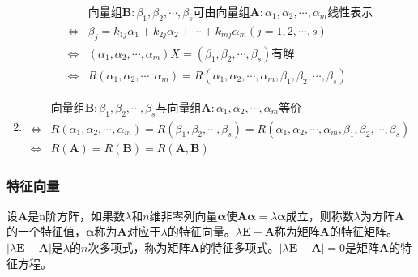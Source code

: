\documentclass[12pt]{book}
\begin{document}
\begin{enumerate}[1.]
\begin{align*}
                              & \text{向量组}\bm{B}:\beta_1,\beta_2,\cdots,\beta_s\text{可由向量组}\bm{A}:\alpha_1,\alpha_2,\cdots,\alpha_m\text{线性表示}                    \\
              \Leftrightarrow & \beta_j = k_{1j}\alpha_1+k_{2j}\alpha_2+\cdots+k_{mj}\alpha_m (j=1,2,\cdots,s)                               \\
              \Leftrightarrow & (\alpha_1,\alpha_2,\cdots,\alpha_m)X = (\beta_1,\beta_2,\cdots,\beta_s)\text{有解}                           \\
              \Leftrightarrow & R(\alpha_1,\alpha_2,\cdots,\alpha_{m})=R(\alpha_1,\alpha_2,\cdots,\alpha_{m},\beta_1,\beta_2,\cdots,\beta_s)
          \end{align*}
    \item
          \begin{align*}
                              & \text{向量组}\bm{B}:\beta_1,\beta_2,\cdots,\beta_s\text{与向量组}\bm{A}:\alpha_1,\alpha_2,\cdots,\alpha_m\text{等价}                                                        \\
              \Leftrightarrow & R(\alpha_1,\alpha_2,\cdots,\alpha_m)=R(\beta_1,\beta_2,\cdots,\beta_s)=R(\alpha_1,\alpha_2,\cdots,\alpha_m,\beta_1,\beta_2,\cdots,\beta_s) \\
              \Leftrightarrow & R(\bm{A})=R(\bm{B})=R(\bm{A},\bm{B})
          \end{align*}
\end{enumerate}


\subsubsection{特征向量}



设$\bm{A}$是n阶方阵，如果数$\lambda$和$n$维非零列向量$\bm{\alpha}$使$\bm{A \alpha}= \lambda \bm{\alpha}$成立，则称数$\lambda$为方阵$\bm{A}$的一个特征值，$\bm{\alpha}$称为$\bm{A}$对应于$\lambda$的特征向量。$\lambda \bm{E}-\bm{A}$称为矩阵$\bm{A}$的特征矩阵。$|\lambda\bm{E}-\bm{A}|$是$\lambda$的$n$次多项式，称为矩阵$\bm{A}$的特征多项式。$|\lambda\bm{E}-\bm{A}|=0$是矩阵$\bm{A}$的特征方程。
\end{document}
